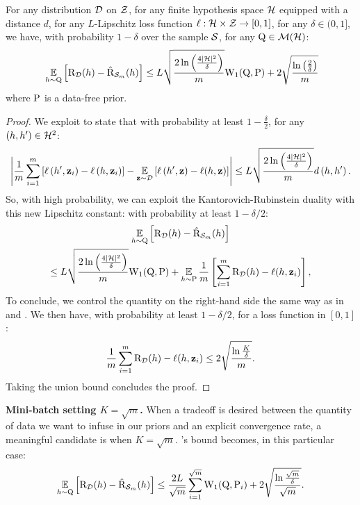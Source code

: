 \begin{noaddcontents}
    \begin{corollary}
    For any distribution $\D$ on $\Z$, for any finite hypothesis space $\H$ equipped with a distance $d$, for any $L$-Lipschitz loss function $\loss: \H\times\Z\to[0,1]$, for any $\delta\in(0,1]$, we have, with probability $1-\delta$ over the sample $\S$, for any $\Q\in\Mcal(\H)$:
    \begin{align*}
    \ \EE_{h\sim\Q}\Big[ \Risk_{\D}(h) - \Riskhat_{\Sm}(h) \Big] \le L\sqrt{\frac{2\ln\left(\frac{4|\H|^2}{\delta}\right)}{m}} \W_{1}(\Q, \P) +  2\sqrt{\frac{\ln\left(\frac{2}{\delta}\right)}{m}} 
     \end{align*}
    where $\P$ is a data-free prior.
    \end{corollary}
    \begin{proof}
        We exploit \cite[][Equation 35]{amit2022integral} to state that with probability at least $1-\frac{\delta}{2}$, for any $(h,h')\in \H^2$: 
        \[\left|\frac{1}{m} \sum_{i=1}^m\left[\loss\left(h^{\prime}, \z_i\right)-\loss\left(h, \z_i\right)\right]-\EE_{\z \sim \D}\left[\loss\left(h^{\prime}, \z\right)-\loss(h, \z)\right]\right| \leq  L \sqrt{\frac{2 \ln \left(\frac{4|\H|^2}{\delta}\right)}{m}}d\left(h, h^{\prime}\right) .\]
    So, with high probability, we can exploit the Kantorovich-Rubinstein duality with this new Lipschitz constant: with probability at least $1-\delta/2$:
    \begin{multline*}
        \EE_{h\sim\Q}\Big[ \Risk_{\D}(h) - \Riskhat_{\Sm}(h) \Big] \\
        \le L \sqrt{\frac{2 \ln \left(\frac{4|\H|^2}{\delta}\right)}{m}}\W_{1}(\Q, \P) +\EE_{h\sim\P} \frac{1}{m}\LB  \sum_{i=1}^m \Risk_{\D}(h) -\loss(h, \z_i) \RB,
    \end{multline*}
    To conclude, we control the quantity on the right-hand side the same way as in  and . We then have, with probability at least $1-\delta/2$, for a loss function in $[0,1]$:
    \[\frac{1}{m} \sum_{i=1}^m \Risk_{\D}(h) -\loss(h, \z_i) \leq 2\sqrt{\frac{\ln\frac{K}{\delta}}{m}}.\]
    Taking the union bound concludes the proof.
    \end{proof}
    
    \textbf{Mini-batch setting $K=\sqrt{m}$.} When a tradeoff is desired between the quantity of data we want to infuse in our priors and an explicit convergence rate, a meaningful candidate is when $K=\sqrt{m}$.  's bound becomes, in this particular case:
    \begin{align}
    \label{eq:supervised-with-tuned-K}
     \EE_{h\sim\Q}\Big[ \Risk_{\D}(h) - \Riskhat_{\Sm}(h) \Big] \le \frac{2L}{\sqrt{m}}\sum_{i=1}^{\sqrt{m}}\W_{1}(\Q, \P_i) + 2\sqrt{\frac{\ln\frac{\sqrt{m}}{\delta}}{\sqrt{m}}}.
    \end{align}
    

\end{noaddcontents}
